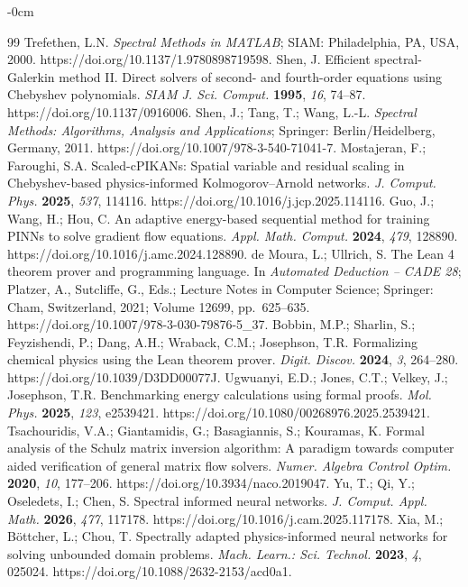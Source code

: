 \begin{adjustwidth}{-\extralength}{0cm}
\begin{thebibliography}{99}
 Trefethen, L.N. \textit{Spectral Methods in MATLAB}; SIAM: Philadelphia, PA, USA, 2000. https://doi.org/10.1137/1.9780898719598.
 Shen, J. Efficient spectral-Galerkin method II. Direct solvers of second- and fourth-order equations using Chebyshev polynomials. \textit{SIAM J. Sci. Comput.} \textbf{1995}, \textit{16}, 74--87. https://doi.org/10.1137/0916006.
 Shen, J.; Tang, T.; Wang, L.-L. \textit{Spectral Methods: Algorithms, Analysis and Applications}; Springer: Berlin/Heidelberg, Germany, 2011. https://doi.org/10.1007/978-3-540-71041-7.
 Mostajeran, F.; Faroughi, S.A. Scaled-cPIKANs: Spatial variable and residual scaling in Chebyshev-based physics-informed Kolmogorov--Arnold networks. \textit{J. Comput. Phys.} \textbf{2025}, \textit{537}, 114116. https://doi.org/10.1016/j.jcp.2025.114116.
 Guo, J.; Wang, H.; Hou, C. An adaptive energy-based sequential method for training PINNs to solve gradient flow equations. \textit{Appl. Math. Comput.} \textbf{2024}, \textit{479}, 128890. https://doi.org/10.1016/j.amc.2024.128890.
 de Moura, L.; Ullrich, S. The Lean 4 theorem prover and programming language. In \textit{Automated Deduction -- CADE 28}; Platzer, A., Sutcliffe, G., Eds.; Lecture Notes in Computer Science; Springer: Cham, Switzerland, 2021; Volume 12699, pp.\ 625--635. https://doi.org/10.1007/978-3-030-79876-5\_37.
 Bobbin, M.P.; Sharlin, S.; Feyzishendi, P.; Dang, A.H.; Wraback, C.M.; Josephson, T.R. Formalizing chemical physics using the Lean theorem prover. \textit{Digit. Discov.} \textbf{2024}, \textit{3}, 264--280. https://doi.org/10.1039/D3DD00077J.
 Ugwuanyi, E.D.; Jones, C.T.; Velkey, J.; Josephson, T.R. Benchmarking energy calculations using formal proofs. \textit{Mol. Phys.} \textbf{2025}, \textit{123}, e2539421. https://doi.org/10.1080/00268976.2025.2539421.
 Tsachouridis, V.A.; Giantamidis, G.; Basagiannis, S.; Kouramas, K. Formal analysis of the Schulz matrix inversion algorithm: A paradigm towards computer aided verification of general matrix flow solvers. \textit{Numer. Algebra Control Optim.} \textbf{2020}, \textit{10}, 177--206. https://doi.org/10.3934/naco.2019047.
 Yu, T.; Qi, Y.; Oseledets, I.; Chen, S. Spectral informed neural networks. \textit{J. Comput. Appl. Math.} \textbf{2026}, \textit{477}, 117178. https://doi.org/10.1016/j.cam.2025.117178.
 Xia, M.; B\"ottcher, L.; Chou, T. Spectrally adapted physics-informed neural networks for solving unbounded domain problems. \textit{Mach. Learn.: Sci. Technol.} \textbf{2023}, \textit{4}, 025024. https://doi.org/10.1088/2632-2153/acd0a1.

\end{thebibliography}
\end{adjustwidth}
